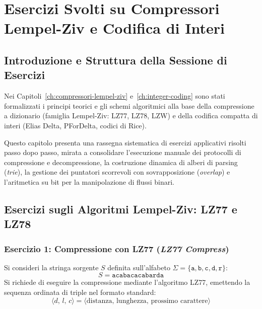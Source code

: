 \chapter{Esercizi Svolti su Compressori Lempel-Ziv e Codifica di Interi}
\label{ch:appendice-esercizi-lz-integer-coding}

\section{Introduzione e Struttura della Sessione di Esercizi}
\label{sec:intro-esercizi-lz-interi}

Nei Capitoli~\ref{ch:compressori-lempel-ziv} e~\ref{ch:integer-coding} sono stati formalizzati i principi teorici e gli schemi algoritmici alla base della compressione a dizionario (famiglia Lempel-Ziv: LZ77, LZ78, LZW) e della codifica compatta di interi (Elias Delta, PForDelta, codici di Rice).

Questo capitolo presenta una rassegna sistematica di esercizi applicativi risolti passo dopo passo, mirata a consolidare l'esecuzione manuale dei protocolli di compressione e decompressione, la costruzione dinamica di alberi di parsing (\textit{trie}), la gestione dei puntatori scorrevoli con sovrapposizione (\textit{overlap}) e l'aritmetica su bit per la manipolazione di flussi binari.

\FloatBarrier
\section{Esercizi sugli Algoritmi Lempel-Ziv: LZ77 e LZ78}
\label{sec:esercizi-lz77-lz78}

\subsection{Esercizio 1: Compressione con LZ77 (\textit{LZ77 Compress})}
\label{subsec:es1-lz77-compress}

\begin{example}
Si consideri la stringa sorgente $S$ definita sull'alfabeto $\Sigma = \{\texttt{a}, \texttt{b}, \texttt{c}, \texttt{d}, \texttt{r}\}$:
\begin{equation}
  S = \texttt{acabacacabarda}
\end{equation}
Si richiede di eseguire la compressione mediante l'algoritmo LZ77, emettendo la sequenza ordinata di triple nel formato standard:
\begin{equation}
  \langle d, \, l, \, c \rangle = \langle \text{distanza}, \, \text{lunghezza}, \, \text{prossimo carattere} \rangle
\end{equation}
\end{example}

